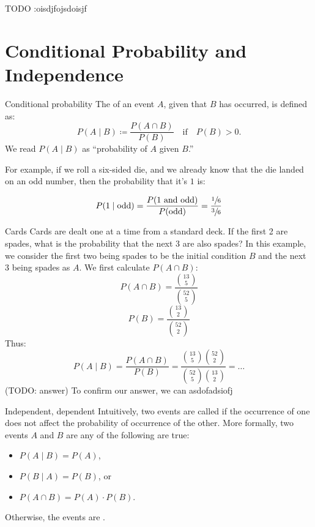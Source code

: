 TODO :oisdjfojsdoisjf

\section{Conditional Probability and Independence}

\begin{dfnbox}{Conditional probability}{}
    The  of an event $A$, given that $B$ has occurred, is defined as:
    \[ P(A \mid B) \coloneq \frac{P(A \cap B)}{P(B)} \quad \text{if} \quad P(B) > 0. \]
    We read $P(A \mid B)$ as ``probability of $A$ given $B$.''
\end{dfnbox}

For example, if we roll a six-sided die, and we already know that the die landed on an odd number, then the probability that it's $1$ is:

\[ P(1 \mid \text{odd}) = \frac{P(1\ \text{and odd})}{P(\text{odd})} = \frac{\sfrac16}{\sfrac36} \]

\begin{exbox}{Cards}{}
    Cards are dealt one at a time from a standard deck. If the first 2 are spades, what is the probability that the next 3 are also spades?
    \tcblower
    In this example, we consider the first two being spades to be the initial condition $B$ and the next 3 being spades as $A$. We first calculate $P(A \cap B)$:
    \[ P(A \cap B) = \frac{\binom{13}{5}}{\binom{52}{5}} \]
    \[ P(B) = \frac{\binom{13}{2}}{\binom{52}{2}} \]
    Thus:
    \[ P(A \mid B) = \frac{P(A \cap B)}{P(B)} = \frac{\binom{13}{5}\binom{52}{2}}{\binom{52}{5}\binom{13}{2}} = \ldots \]
    (TODO: answer)
    To confirm our answer, we can asdofadsiofj
\end{exbox}

\begin{dfnbox}{Independent, dependent}{}
    Intuitively, two events are called  if the occurrence of one does not affect the probability of occurrence of the other.
    \tcblower
    More formally, two events $A$ and $B$ are  any of the following are true:
    \begin{itemize}
        \item $P(A \mid B) = P(A)$,
        \item $P(B \mid A) = P(B)$, or
        \item $P(A \cap B) = P(A) \cdot P(B)$.
    \end{itemize}
    Otherwise, the events are .
\end{dfnbox}

